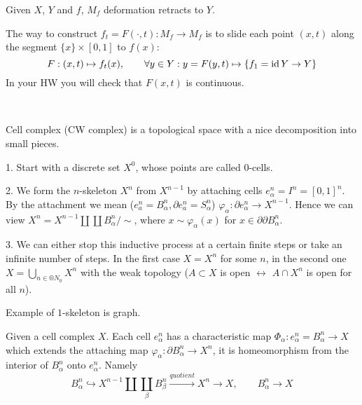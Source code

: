\documentclass[12pt]{article}					%
\begin{document}
\begin{tvrzeni}
	Given $X$, $Y$ and $f$, $M_f$ deformation retracts to $Y$.

	\begin{dukazin}
		The way to construct $f_t = F(·, t): M_f \rightarrow M_f$ is to slide each point $(x, t)$ along the segment $\{x\}\times[0, 1]$ to $f(x)$:
		$$ F: (x, t) \mapsto f_t(x), \qquad \forall y \in Y: y = F(y, t) \mapsto \{f_1 = \operatorname{id} Y \rightarrow Y\} $$
		In your HW you will check that $F(x, t)$ is continuous.
	\end{dukazin}
\end{tvrzeni}

\begin{definice}
	\ 

	\begin{poznamkain}
		Cell complex (CW complex) is a topological space with a nice decomposition into small pieces.
	\end{poznamkain}

	1. Start with a discrete set $X^0$, whose points are called $0$-cells.

	2. We form the $n$-skeleton $X^n$ from $X^{n - 1}$ by attaching cells $e_α^n = I^n = [0, 1]^n$. By the attachment we mean ($e_a^n = B_α^n, \partial e_a^n = S_α^n$) $φ_α: \partial e_α^n \rightarrow X^{n-1}$. Hence we can view $X^n = X^{n-1} \coprod \coprod B_α^n / \sim$, where $x \sim φ_α(x)$ for $x \in \partial \partial B_α^n$.

	3. We can either stop this inductive process at a certain finite steps or take an infinite number of steps. In the first case $X = X^n$ for some $n$, in the second one $X = \bigcup_{n \in ®N_0} X^n$ with the weak topology ($A \subset X$ is open $\leftrightarrow$ $A \cap X^n$ is open for all $n$).

	\begin{prikladyin}
		Example of $1$-skeleton is graph.
	\end{prikladyin}
\end{definice}

\begin{definice}
	Given a cell complex $X$. Each cell $e_α^n$ has a characteristic map $Φ_α: e_α^n = B_α^n \rightarrow X$ which extends the attaching map $φ_α: \partial B_α^n \rightarrow X^n$, it is homeomorphism from the interior of $B_α^n$ onto $e_α^n$. Namely
	$$ B_α^n \hookrightarrow X^{n-1} \coprod \coprod_β B_β^n \overset{quotient}\rightarrow X^n \rightarrow X, \qquad B_α^n \rightarrow X $$
\end{definice}
\end{document}
